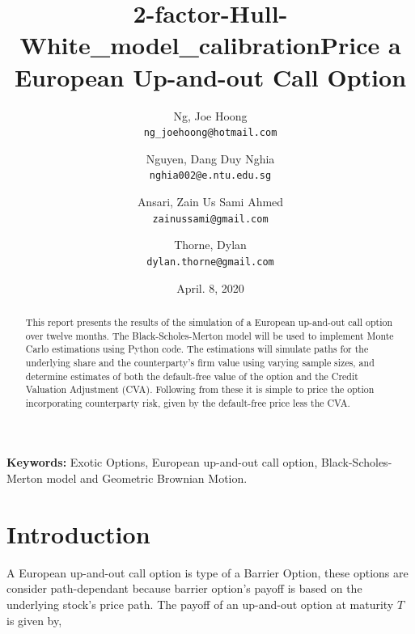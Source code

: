 \documentclass[11pt]{article}
\title{2-factor-Hull-White\_model\_calibration}
\begin{document}
\nocite{*} %

\title{Price a European Up-and-out Call Option}

\author{
  Ng, Joe Hoong\\
  \texttt{ng\_joehoong@hotmail.com}
  \and
  Nguyen, Dang Duy Nghia \\
  \texttt{nghia002@e.ntu.edu.sg}
   \and
  Ansari, Zain Us Sami Ahmed \\
  \texttt{zainussami@gmail.com}  
   \and
   Thorne, Dylan \\
  \texttt{dylan.thorne@gmail.com}  
  }

\date{April. 8, 2020} %
\maketitle

\noindent
\textbf{Keywords:} Exotic Options, European up-and-out call option,  Black-Scholes-Merton model and Geometric Brownian Motion.



\begin{abstract}
This report presents the results of the simulation of a European up-and-out call option over twelve months.  The Black-Scholes-Merton model will be used to implement Monte Carlo estimations using Python code. The estimations will simulate paths for the underlying share and the counterparty's firm value using varying sample sizes, and determine estimates of both the default-free value of the option and the Credit Valuation Adjustment (CVA). Following from these it is simple to price the option incorporating counterparty risk, given by the default-free price less the CVA.
\end{abstract}

\section{Introduction
}
A European up-and-out call option is type of a Barrier Option, these options are consider path-dependant because barrier option's payoff is based on the underlying stock's price path.  The payoff of an up-and-out option at maturity $T$ is given by,
\end{document}
